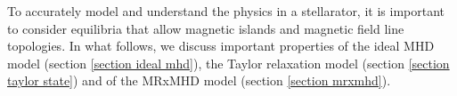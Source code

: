 \documentclass[my_thesis.tex]{subfiles}
\begin{document}

To accurately model and understand the physics in a stellarator, it is important to consider equilibria that allow magnetic islands and magnetic field line topologies. In what follows, we discuss important properties of the ideal \ac{MHD} model (section \ref{section ideal mhd}), the Taylor relaxation model (section \ref{section taylor state}) and of the \ac{MRxMHD} model (section \ref{section mrxmhd}).



\end{document}
